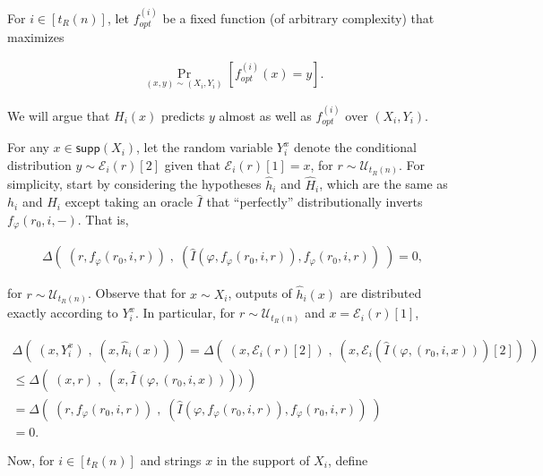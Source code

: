 \documentclass[10pt,a4paper]{article}
\begin{document}
For $i\in[t_{R}(n)]$, let $f_{opt}^{(i)}$ be a fixed function (of arbitrary complexity) that maximizes\par


\[\begin{gathered}
\Pr_{(x,y)\sim(X_{i},Y_{i})}[f_{opt}^{(i)}(x)=y].
\end{gathered}\]


We will argue that $H_{i}(x)$ predicts $y$ almost as well as $f_{opt}^{(i)}$ over $(X_{i},Y_{i})$.\par




For any $x\in{\mathsf{supp}}(X_{i})$, let the random variable $Y_{i}^{x}$ denote the conditional distribution $y\sim\mathcal{E}_{i}(r)[2]$ given that $\mathcal{E}_{i}(r)[1]=x$, for $r\sim\mathcal{U}_{t_{R}(n)}$. For simplicity, start by considering the hypotheses $\hat{h}_{i}$ and $\hat{H}_{i}$, which are the same as $h_{i}$ and $H_{i}$ except taking an oracle $\hat{I}$ that “perfectly” distributionally inverts $f_{\varphi}(r_{0},i,-)$. That is,\par


\[\begin{gathered}
\displaystyle\Delta\left(\;(r,f_{\varphi}(r_{0},i,r))\;,\;(\hat{I}(\varphi,f_{\varphi}(r_{0},i,r)),f_{\varphi}(r_{0},i,r))\;\right)=0,
\end{gathered}\]


for $r\sim\mathcal{U}_{t_{R}(n)}$. Observe that for $x\sim X_{i}$, outputs of $\hat{h}_{i}(x)$ are distributed exactly according to $Y_{i}^{x}$. In particular, for $r\sim\mathcal{U}_{t_{R}(n)}$ and $x=\mathcal{E}_{i}(r)[1]$,\par


\[\begin{gathered}
\displaystyle\Delta\left(\;(x,Y^{x}_{i})\;,\;(x,\hat{h}_{i}(x))\;\right) \displaystyle=\Delta\left(\;(x,\mathcal{E}_{i}(r)[2])\;,\;(x,\mathcal{E}_{i}(\hat{I}(\varphi,(r_{0},i,x)))[2])\;\right) \\
\displaystyle\leq\Delta\left(\;(x,r)\;,\;(x,\hat{I}(\varphi,(r_{0},i,x))))\;\right) \\
\displaystyle=\Delta\left(\;(r,f_{\varphi}(r_{0},i,r))\;,\;(\hat{I}(\varphi,f_{\varphi}(r_{0},i,r)),f_{\varphi}(r_{0},i,r))\;\right) \\
\displaystyle=0.
\end{gathered}\]


Now, for $i\in[t_{R}(n)]$ and strings $x$ in the support of $X_{i}$, define\par
\end{document}
